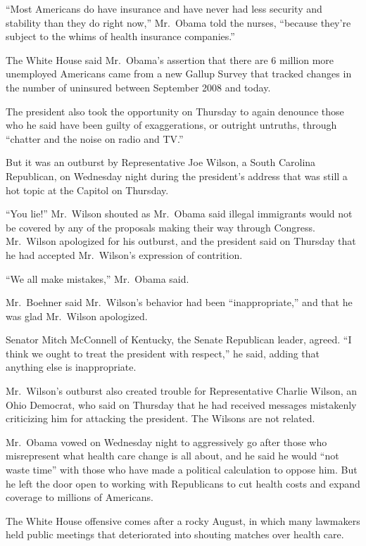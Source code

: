 ﻿\documentclass[12pt]{article}
\begin{document}
``Most Americans do have insurance and have never had less security and stability than they do right
now,'' Mr.~Obama told the nurses, ``because they're subject to the whims of health insurance
companies.''

The White House said Mr.~Obama's assertion that there are 6 million more unemployed Americans came
from a new Gallup Survey that tracked changes in the number of uninsured between September 2008 and
today.

The president also took the opportunity on Thursday to again denounce those who he said have been
guilty of exaggerations, or outright untruths, through ``chatter and the noise on radio and TV.''

But it was an outburst by Representative Joe Wilson, a South Carolina Republican, on Wednesday night
during the president's address that was still a hot topic at the Capitol on Thursday.

``You lie!'' Mr.~Wilson shouted as Mr.~Obama said illegal immigrants would not be covered by any of
the proposals making their way through Congress. Mr.~Wilson apologized for his outburst, and the
president said on Thursday that he had accepted Mr.~Wilson's expression of contrition.

``We all make mistakes,'' Mr.~Obama said.

Mr.~Boehner said Mr.~Wilson's behavior had been ``inappropriate,'' and that he was glad Mr.~Wilson
apologized.

Senator Mitch McConnell of Kentucky, the Senate Republican leader, agreed. ``I think we ought to
treat the president with respect,'' he said, adding that anything else is inappropriate.

Mr.~Wilson's outburst also created trouble for Representative Charlie Wilson, an Ohio Democrat, who
said on Thursday that he had received messages mistakenly criticizing him for attacking the
president. The Wilsons are not related.

Mr.~Obama vowed on Wednesday night to aggressively go after those who misrepresent what health care
change is all about, and he said he would ``not waste time'' with those who have made a political
calculation to oppose him. But he left the door open to working with Republicans to cut health costs
and expand coverage to millions of Americans.

The White House offensive comes after a rocky August, in which many lawmakers held public meetings
that deteriorated into shouting matches over health care.
\end{document}
